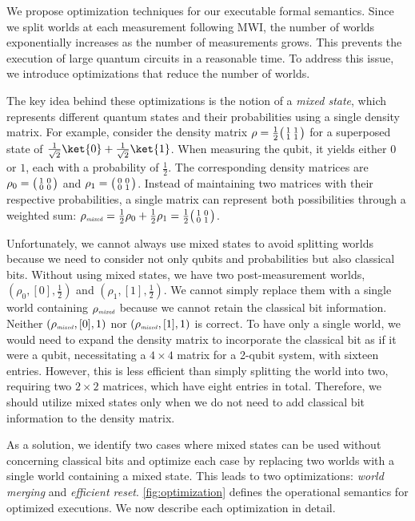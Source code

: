 \noindent
We propose optimization techniques for our executable formal semantics.
%
Since we split worlds at each measurement following MWI, the number of worlds
exponentially increases as the number of measurements grows.
%
This prevents the execution of large quantum circuits in a reasonable time.
%
To address this issue, we introduce optimizations that reduce the number of
worlds.

The key idea behind these optimizations is the notion of a \emph{mixed state},
which represents different quantum states and their probabilities using a
single density matrix.
%
For example, consider the density matrix $\rho=\tfrac{1}{2}\big(\begin{smallmatrix}1&1\\1&1\end{smallmatrix}\big)$
for a superposed state of
$\tfrac{1}{\sqrt{2}}\ket{0}+\tfrac{1}{\sqrt{2}}\ket{1}$.
%
When measuring the qubit, it yields either $0$ or $1$, each with a probability
of $\frac{1}{2}$.
%
The corresponding density matrices are $\rho_0=\big(\begin{smallmatrix}1&0\\0&0\end{smallmatrix}\big)$ and
$\rho_1=\big(\begin{smallmatrix}0&0\\0&1\end{smallmatrix}\big)$.
%
Instead of maintaining two matrices with their respective probabilities, a
single matrix can represent both possibilities through a weighted sum:
%
$\rho_{\mbox{\emph{\tiny mixed}}} = \tfrac{1}{2}\rho_0+\tfrac{1}{2}\rho_1 =
	\tfrac{1}{2}\big(\begin{smallmatrix}1&0\\0&1\end{smallmatrix}\big)$.

Unfortunately, we cannot always use mixed states to avoid splitting worlds
because we need to consider not only qubits and probabilities but also
classical bits.
%
Without using mixed states, we have two post-measurement worlds,
$(\rho_0,[0],\frac{1}{2})$ and $(\rho_1,[1],\frac{1}{2})$.
%
We cannot simply replace them with a single world containing
$\rho_{\mbox{\emph{\tiny mixed}}}$ because we cannot retain the classical bit
information.
%
Neither $(\rho_{\mbox{\emph{\tiny mixed}}},[0],1)$ nor $(\rho_{\mbox{\emph{\tiny
			mixed}}},[1],1)$ is correct.
%
To have only a single world, we would need to expand the density matrix to
incorporate the classical bit as if it were a qubit, necessitating a $4\times
	4$ matrix for a 2-qubit system, with sixteen entries.
%
However, this is less efficient than simply splitting the world into two,
requiring two $2\times 2$ matrices, which have eight entries in total.
%
Therefore, we should utilize mixed states only when we do not need to add
classical bit information to the density matrix.

As a solution, we identify two cases where mixed states can be used without
concerning classical bits and optimize each case by replacing two worlds with a
single world containing a mixed state.
%
This leads to two optimizations: \emph{world merging} and \emph{efficient
	reset}.
%
\cref{fig:optimization} defines the operational semantics for optimized
executions.
%
We now describe each optimization in detail.

